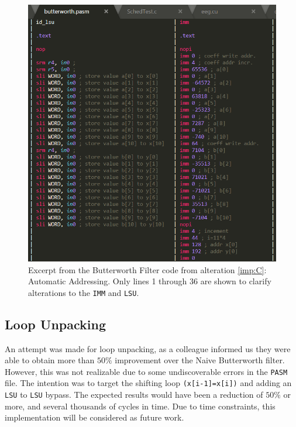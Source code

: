 \documentclass[letterpaper, 10 pt, conference]{ieeeconf}  %
\begin{document}
\begin{figure}[h!]
\begin{center}
\includegraphics[scale=0.35]{images/assem01.png}
\caption{Excerpt from the Butterworth Filter code from alteration \ref{imp:C}: Automatic Addressing. Only lines 1 through 36 are shown to clarify alterations to the \texttt{IMM} and \texttt{LSU}.}
\label{fig:assem01}
\end{center}
\end{figure}

\subsection{Loop Unpacking}
\label{imp:D}

An attempt was made for loop unpacking, as a colleague informed us they were able to obtain more than $50\%$ improvement over the Naive Butterworth filter. However, this was not realizable due to some undiscoverable errors in the \texttt{PASM} file. The intention was to target the shifting loop \texttt{(x[i-1]=x[i])} and adding an \texttt{LSU} to \texttt{LSU} bypass. The expected results would have been a reduction of $50\%$ or more, and several thousands of cycles in time. Due to time constraints, this implementation will be considered as future work.  
\end{document}
